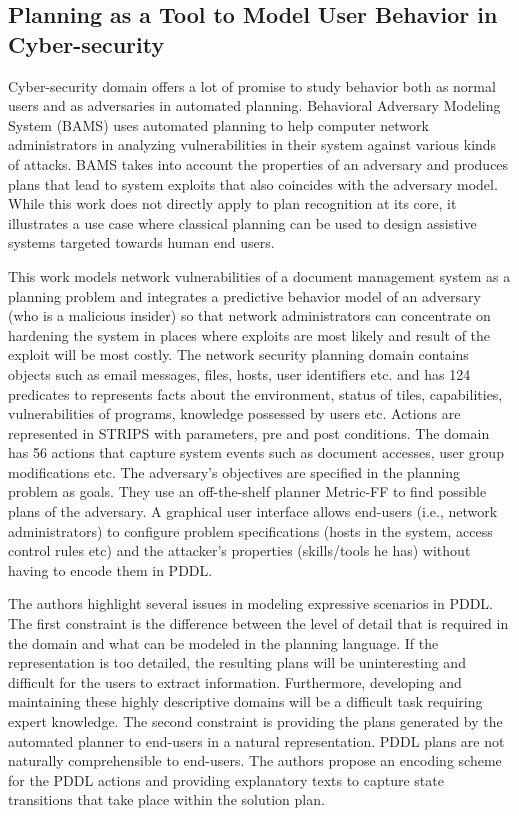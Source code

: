 \subsection{Planning as a Tool to Model User Behavior in Cyber-security}
Cyber-security domain offers a lot of promise to study behavior both as normal users and as adversaries in automated planning. Behavioral Adversary Modeling System (BAMS) \cite{boddy2005course} uses automated planning to help computer network administrators in analyzing vulnerabilities in their system against various kinds of attacks. BAMS takes into account the properties of an adversary and produces plans that lead to system exploits that also coincides with the adversary model. While this work does not directly apply to plan recognition at its core, it illustrates a use case where classical planning can be used to design assistive systems targeted towards human end users.

This work models network vulnerabilities of a document management system as a planning problem and integrates a predictive behavior model of an adversary (who is a malicious insider) so that network administrators can concentrate on hardening the system in places where exploits are most likely and result of the exploit will be most costly. The network security planning domain contains objects such as email messages, files, hosts, user identifiers etc. and has 124 predicates to represents facts about the environment, status of tiles, capabilities, vulnerabilities of programs, knowledge possessed by users etc. Actions are represented in STRIPS with parameters, pre and post conditions. The domain has 56 actions that capture system events such as document accesses, user group modifications etc. The adversary's objectives are specified in the planning problem as goals. They use an off-the-shelf planner Metric-FF  \cite{hoffman2003ff} to find possible plans of the adversary. A graphical user interface allows end-users (i.e., network administrators) to configure problem specifications (hosts in the system, access control rules etc) and the attacker's properties (skills/tools he has) without having to encode them in PDDL.

The authors highlight several issues in modeling expressive scenarios in PDDL. 
The first constraint is the difference between the level of detail that is required in the domain and what can be modeled in the planning language. If the representation is too detailed, the resulting plans will be uninteresting and difficult for the users to extract information. Furthermore, developing and maintaining these highly descriptive domains will be a difficult task requiring expert knowledge. The second constraint is providing the plans generated by the automated planner to end-users in a natural representation. PDDL plans are not naturally comprehensible to end-users. The authors propose an encoding scheme for the PDDL actions and providing explanatory texts to capture state transitions that take place within the solution plan.


